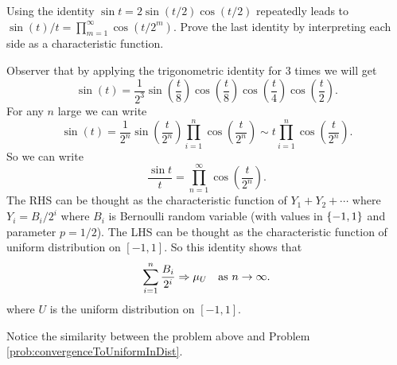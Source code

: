 \begin{problem}
	Using the identity $ \sin t = 2 \sin (t/2)\cos(t/2) $ repeatedly leads to $ \sin(t)/t = \prod_{m=1}^{\infty}\cos(t/2^m) $. Prove the last identity by interpreting each side as a characteristic function.
\end{problem}
\begin{problem}
	Observer that by applying the trigonometric identity for 3 times we will get
	\[ \sin(t) = \frac{1}{2^3}\sin(\frac{t}{8})\cos(\frac{t}{8})\cos(\frac{t}{4})\cos(\frac{t}{2}).  \]
	For any $ n $ large we can write
	\[ \sin(t) = \frac{1}{2^n}\sin(\frac{t}{2^n})\prod_{i=1}^n \cos(\frac{t}{2^n})\sim t\prod_{i=1}^n \cos(\frac{t}{2^n}). \]
	So we can write
	\[ \frac{\sin t}{t} = \prod_{n=1}^{\infty} \cos(\frac{t}{2^n}). \]
	The RHS can be thought as the characteristic function of $ Y_1+Y_2+\cdots $ where $ Y_i = B_i/2^i $ where $ B_i $ is Bernoulli random variable (with values in $ \{-1,1\} $ and parameter $ p=1/2 $). The LHS can be thought as the characteristic function of uniform distribution on $ [-1,1] $. So this identity shows that
	\[ \sum_{i=1}^{n}\frac{B_i}{2^i} \Rightarrow \mu_U \quad \text{as $ n\to\infty $}. \]
	where $ U $ is the uniform distribution on $ [-1,1] $.
\end{problem}
\begin{remark}
	Notice the similarity between the problem above and Problem \autoref{prob:convergenceToUniformInDist}.
\end{remark}

